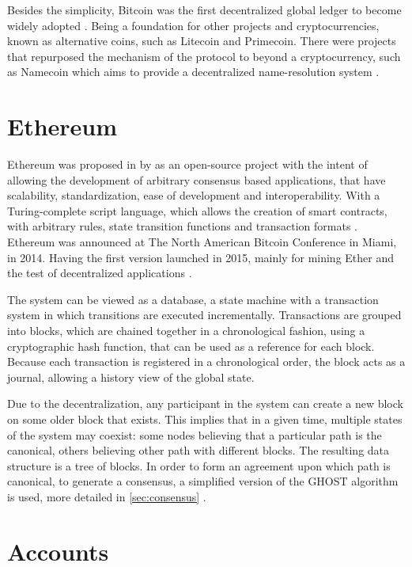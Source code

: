 \documentclass[
    article, 
    12pt,				%
	oneside,			%
	a4paper,			%
	chapter=TITLE,		%
	section=TITLE,		%
	english,			%
	english,				%
	sumario=tradicional
]{abntex2}
\begin{document}
Besides the simplicity, Bitcoin was the first decentralized global ledger to become widely adopted \cite{wood_ethereum_2021}.
Being a foundation for other projects and cryptocurrencies, known as alternative coins, such as Litecoin and Primecoin.
There were projects that repurposed the mechanism of the protocol to beyond a cryptocurrency, such as Namecoin which aims to provide a decentralized name-resolution system \cite{wood_ethereum_2021}.  


\section{Ethereum}

Ethereum was proposed in \citeyear{buterin_eth_whitepaper_2013} by \citeauthor{buterin_eth_whitepaper_2013} as an open-source project with the intent of allowing the development of arbitrary consensus based applications, that have scalability, standardization, ease of development and interoperability. 
With a Turing-complete script language, which allows the creation of smart contracts, with arbitrary rules, state transition functions and transaction formats \cite{buterin_eth_whitepaper_2013}.
Ethereum was announced at The North American Bitcoin Conference in Miami, in 2014.
Having the first version launched in 2015, mainly for mining Ether and the test of decentralized applications \cite{eth_history_jianing_2021}. 

The system can be viewed as a database, a state machine with a transaction system in which transitions are executed incrementally.
Transactions are grouped into blocks, which are chained together in a chronological fashion, using a cryptographic hash function, that can be used as a reference for each block.
Because each transaction is registered in a chronological order, the block acts as a journal, allowing a history view of the global state.

Due to the decentralization, any participant in the system can create a new block on some older block that exists.
This implies that in a given time, multiple states of the system may coexist: some nodes believing that a particular path is the canonical, others believing other path with different blocks.
The resulting data structure is a tree of blocks. 
In order to form an agreement upon which path is canonical, to generate a consensus, a simplified version of the GHOST algorithm is used, more detailed in \autoref{sec:consensus} \cite{wood_ethereum_2021}.


\section{Accounts}
\end{document}
